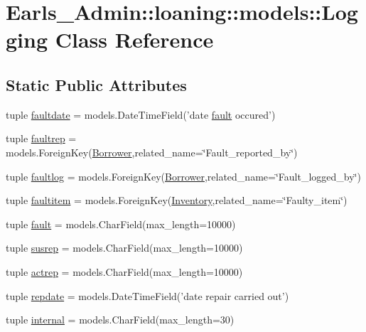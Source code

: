 \hypertarget{classEarls__Admin_1_1loaning_1_1models_1_1Logging}{
\section{Earls\_\-Admin::loaning::models::Logging Class Reference}
\label{classEarls__Admin_1_1loaning_1_1models_1_1Logging}
}
\subsection*{Static Public Attributes}
\begin{CompactItemize}
\item 
tuple \hyperlink{classEarls__Admin_1_1loaning_1_1models_1_1Logging_4650b5b238266461bb40ee5470326fee}{faultdate} = models.DateTimeField('date \hyperlink{classEarls__Admin_1_1loaning_1_1models_1_1Logging_eaa026062e1feffc8ded9ba05734c88d}{fault} occured')
\item 
tuple \hyperlink{classEarls__Admin_1_1loaning_1_1models_1_1Logging_fe3d4ddd3051413989da3f0293057363}{faultrep} = models.ForeignKey(\hyperlink{classEarls__Admin_1_1loaning_1_1models_1_1Borrower}{Borrower},related\_\-name=\char`\"{}Fault\_\-reported\_\-by\char`\"{})
\item 
tuple \hyperlink{classEarls__Admin_1_1loaning_1_1models_1_1Logging_a46ce33fe9c2910c39ddf8678dc3de47}{faultlog} = models.ForeignKey(\hyperlink{classEarls__Admin_1_1loaning_1_1models_1_1Borrower}{Borrower},related\_\-name=\char`\"{}Fault\_\-logged\_\-by\char`\"{})
\item 
tuple \hyperlink{classEarls__Admin_1_1loaning_1_1models_1_1Logging_3cef9eed464e6e3556ed1baac8930440}{faultitem} = models.ForeignKey(\hyperlink{classEarls__Admin_1_1loaning_1_1models_1_1Inventory}{Inventory},related\_\-name=\char`\"{}Faulty\_\-item\char`\"{})
\item 
tuple \hyperlink{classEarls__Admin_1_1loaning_1_1models_1_1Logging_eaa026062e1feffc8ded9ba05734c88d}{fault} = models.CharField(max\_\-length=10000)
\item 
tuple \hyperlink{classEarls__Admin_1_1loaning_1_1models_1_1Logging_c8206aaa16d85867e67d3290e7038371}{susrep} = models.CharField(max\_\-length=10000)
\item 
tuple \hyperlink{classEarls__Admin_1_1loaning_1_1models_1_1Logging_2379dd94ab713855ffd0520609d7ddee}{actrep} = models.CharField(max\_\-length=10000)
\item 
tuple \hyperlink{classEarls__Admin_1_1loaning_1_1models_1_1Logging_f7ea8aac8a3dc2b399022e13bce6eba3}{repdate} = models.DateTimeField('date repair carried out')
\item 
tuple \hyperlink{classEarls__Admin_1_1loaning_1_1models_1_1Logging_6df5e99119a50f3e739c6342970c93ea}{internal} = models.CharField(max\_\-length=30)
\end{CompactItemize}


